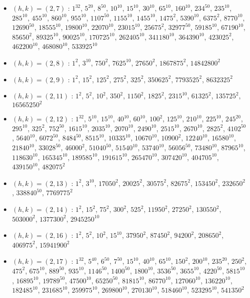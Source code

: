 \begin{itemize}
\item $(h,k)=(2,7)$ : $1^{32}$, $5^{20}$, $8^{50}$, $10^{10}$, $15^{10}$, $30^{10}$, $65^{10}$, $160^{10}$, $234^{50}$, $235^{10}$, $285^{10}$, $455^{10}$, $860^{10}$, $955^{10}$, $1107^{50}$, $1155^{10}$, $1455^{10}$, $1475^{2}$, $5390^{10}$, $6375^{2}$, $8770^{10}$, $12690^{50}$, $18555^{10}$, $19800^{10}$, $22070^{10}$, $23015^{10}$, $25675^{2}$, $32977^{50}$, $59185^{10}$, $67190^{10}$, $85650^{2}$, $89325^{10}$, $90025^{10}$, $170725^{10}$, $262405^{10}$, $341180^{10}$, $364390^{10}$, $423025^{2}$, $462200^{10}$, $468080^{10}$, $533925^{10}$
\item $(h,k)=(2,8)$ : $1^{2}$, $3^{10}$, $750^{2}$, $7625^{10}$, $27650^{2}$, $1867875^{2}$, $14842800^{2}$
\item $(h,k)=(2,9)$ : $1^{2}$, $15^{2}$, $125^{2}$, $275^{2}$, $325^{2}$, $350625^{2}$, $7793525^{2}$, $8632325^{2}$
\item $(h,k)=(2,11)$ : $1^{2}$, $5^{2}$, $10^{2}$, $350^{2}$, $1150^{2}$, $1825^{2}$, $2315^{10}$, $61325^{2}$, $135725^{2}$, $16565250^{2}$
\item $(h,k)=(2,12)$ : $1^{32}$, $5^{10}$, $15^{10}$, $40^{10}$, $60^{10}$, $100^{2}$, $125^{10}$, $210^{10}$, $225^{10}$, $245^{20}$, $295^{10}$, $325^{2}$, $752^{50}$, $1615^{10}$, $2035^{10}$, $2070^{10}$, $2490^{10}$, $2515^{10}$, $2670^{10}$, $2825^{2}$, $4102^{50}$, $5640^{10}$, $6072^{50}$, $8484^{50}$, $8515^{10}$, $10335^{10}$, $10670^{10}$, $10900^{2}$, $12240^{10}$, $16580^{10}$, $21840^{10}$, $33028^{50}$, $46000^{2}$, $51040^{50}$, $51540^{10}$, $53740^{10}$, $56056^{50}$, $73480^{10}$, $87965^{10}$, $118630^{10}$, $165345^{10}$, $189585^{10}$, $191615^{10}$, $265470^{10}$, $307420^{10}$, $404705^{10}$, $439150^{10}$, $482075^{2}$
\item $(h,k)=(2,13)$ : $1^{2}$, $3^{10}$, $17050^{2}$, $20025^{2}$, $30575^{2}$, $82675^{2}$, $153450^{2}$, $232650^{2}$, $338840^{50}$, $7769775^{2}$
\item $(h,k)=(2,14)$ : $1^{2}$, $15^{2}$, $75^{2}$, $300^{2}$, $525^{2}$, $11950^{2}$, $27250^{2}$, $130550^{2}$, $503000^{2}$, $1377300^{2}$, $2945250^{10}$
\item $(h,k)=(2,16)$ : $1^{2}$, $5^{2}$, $10^{2}$, $15^{10}$, $37950^{2}$, $87450^{2}$, $94200^{2}$, $208650^{2}$, $406975^{2}$, $15941900^{2}$
\item $(h,k)=(2,17)$ : $1^{32}$, $5^{40}$, $6^{50}$, $7^{50}$, $15^{10}$, $40^{10}$, $65^{10}$, $150^{2}$, $200^{10}$, $235^{20}$, $250^{2}$, $475^{2}$, $675^{10}$, $889^{50}$, $935^{10}$, $1146^{50}$, $1400^{50}$, $1800^{10}$, $3536^{50}$, $3655^{10}$, $4220^{50}$, $5815^{10}$, $16895^{10}$, $19789^{50}$, $47500^{10}$, $65250^{50}$, $81815^{10}$, $86770^{10}$, $127060^{10}$, $136220^{10}$, $182485^{10}$, $231685^{10}$, $259975^{10}$, $269800^{10}$, $270130^{10}$, $518460^{10}$, $523295^{10}$, $541350^{2}$

\end{itemize}
